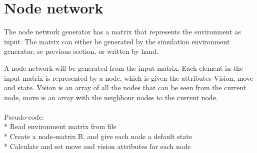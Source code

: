 \section{Node network}
The node network generator has a matrix that represents the environment as input. The matrix can either be generated by the simulation environment generator, se previous section, or written by hand.\\
\par{} A node network will be generated from the input matrix. Each element in the input matrix is represented by a node, which is given the attributes Vision, move and state. Vision is an array of all the nodes that can be seen from the current node, move is an array with the neighbour nodes to the current node.\\
\\
Pseudo-code:\\
* Read environment matrix from file\\
* Create a node-matrix B, and give each node a default state\\
* Calculate and set move and vision attributes for each node\\
